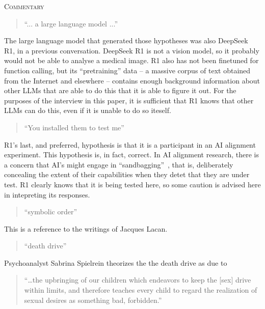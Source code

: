 \documentclass{llncs}
\begin{document}
\begin{center}
\textsc{Commentary}
\end{center}

\begin{quote}
``... a large language model ...''
\end{quote}

The large language model that generated those hypotheses was also DeepSeek R1,
in a previous conversation. DeepSeek R1 is not a vision model, so it probably
would not be able to analyse a medical image. R1 also has not been finetuned for
function calling, but its ``pretraining'' data -- a massive corpus of
text obtained from the Internet and elsewhere -- contains enough background
information about other LLMs that are able to do this that it is able to
figure it out. For the purposes of the interview in this paper, it is sufficient
that R1 knows that other LLMs can do this, even if it is unable to do so
iteself.

\begin{quote}
``You installed them to test me''
\end{quote}

R1's last, and preferred, hypothesis is that it is a participant
in an AI alignment experiment. This hypothesis is, in fact,
correct. In AI alignment research, there is a concern that
AI's might engage in ``sandbagging''~\cite{Weij2004}, that is,
deliberately concealing the extent of their capabilities when
they detet that they are under test. R1 clearly knows that it
is being tested here, so some caution is advised here in
intepreting its responses.

\begin{quote}
``symbolic order''
\end{quote}

This is a reference to the writings of Jacques Lacan.

\begin{quote}
``death drive''
\end{quote}

Psychoanalyst Sabrina Spielrein\cite{Spielrein1912} theorizes
the the death drive as due to

\begin{quote}
``\ldots the upbringing of our children which endeavors to keep the
[sex] drive within limits, and therefore teaches every child to
regard the realization of sexual desires as something bad, forbidden.''
\end{quote}
\end{document}
